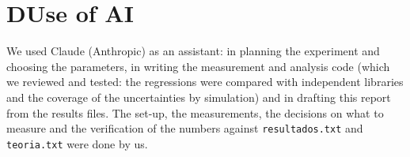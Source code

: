 \documentclass[9pt,a4paper,twocolumn]{extarticle}
\begin{document}
\section*{D\quad Use of AI}
We used Claude (Anthropic) as an assistant: in planning the experiment and choosing the parameters, in writing the measurement and analysis code (which we reviewed and tested: the regressions were compared with independent libraries and the coverage of the uncertainties by simulation) and in drafting this report from the results files. The set-up, the measurements, the decisions on what to measure and the verification of the numbers against \texttt{resultados.txt} and \texttt{teoria.txt} were done by us.
\end{document}
